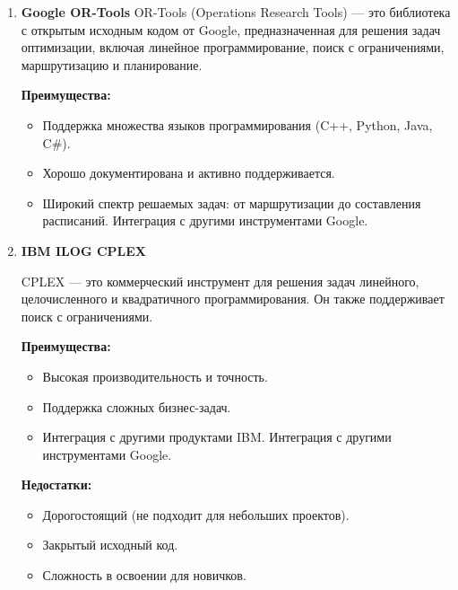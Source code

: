  \begin{enumerate}
    \item \noindent \textbf{Google OR-Tools}
OR-Tools (Operations Research Tools) — это библиотека с открытым исходным кодом от Google, предназначенная для решения задач оптимизации, включая линейное программирование, поиск с ограничениями, маршрутизацию и планирование.

\vspace{6mm}

\noindent \textbf{Преимущества:}
\begin{itemize}
    \item Поддержка множества языков программирования (C++, Python, Java, C\#).
    \item Хорошо документирована и активно поддерживается.
    \item Широкий спектр решаемых задач: от маршрутизации до составления расписаний.
Интеграция с другими инструментами Google.
\end{itemize} 

\vspace{6mm}

\item \noindent \textbf{IBM ILOG CPLEX}

CPLEX — это коммерческий инструмент для решения задач линейного, целочисленного и квадратичного программирования. Он также поддерживает поиск с ограничениями.
\vspace{6mm}

\noindent \textbf{Преимущества:}
\begin{itemize}
    \item Высокая производительность и точность.
    \item Поддержка сложных бизнес-задач.
    \item Интеграция с другими продуктами IBM.
Интеграция с другими инструментами Google.
\end{itemize}

\vspace{6mm}

\noindent \textbf{Недостатки:}
\begin{itemize}
\item Дорогостоящий (не подходит для небольших проектов).
\item Закрытый исходный код.
\item Сложность в освоении для новичков.
\end{itemize}

\vspace{6mm}


\end{enumerate}

